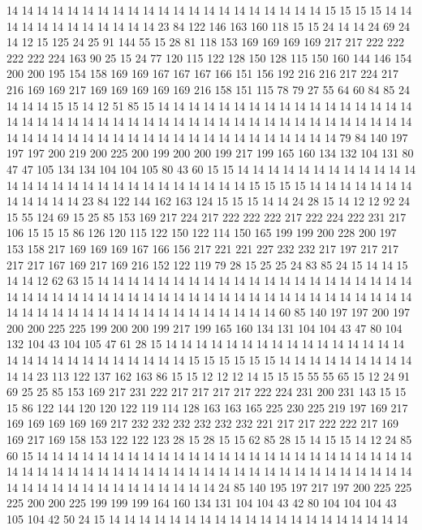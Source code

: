 14 14 14 14 14 14 14 14 14 14 14 14 14 14 14 14 14 14 14 14
14 15 15 15 15 14 14 14 14 14 14 14 14 14 14 14 14 23 84 122
146 163 160 118 15 15 24 14 14 24 69 24 14 12 15 125 24 25 91 144
55 15 28 81 118 153 169 169 169 169 217 217 222 222 222 222 224 163 90 25
15 24 77 120 115 122 128 150 128 115 150 160 144 146 154 200 200 195 154 158
169 169 167 167 167 166 151 156 192 216 216 217 224 217 216 169 169 217 169 169
169 169 169 216 158 151 115 78 79 27 55 64 60 84 85 24 14 14 14 15
15 14 12 51 85 15 14 14 14 14 14 14 14 14 14 14 14 14 14 14
14 14 14 14 14 14 14 14 14 14 14 14 14 14 14 14 14 14 14 14
14 14 14 14 14 14 14 14 14 14 14 14 14 14 14 14 14 14 14 14
14 14 14 14 14 14 14 14 14 14 14 14 79 84 140 197 197 197 200 219
200 225 200 199 200 200 199 217 199 165 160 134 132 104 131 80 47 47 105 134
134 104 104 105 80 43 60 15 15 14 14 14 14 14 14 14 14 14 14 14
14 14 14 14 14 14 14 14 14 14 14 14 14 14 14 14 14 15 15 15
15 14 14 14 14 14 14 14 14 14 14 14 14 23 84 122 144 162 163 124
15 15 15 14 14 24 28 15 14 12 12 92 24 15 55 124 69 15 25 85
153 169 217 224 217 222 222 222 217 222 224 222 231 217 106 15 15 15 86 126
120 115 122 150 122 114 150 165 199 199 200 228 200 197 153 158 217 169 169 169
167 166 156 217 221 221 227 232 232 217 197 217 217 217 217 167 169 217 169 216
152 122 119 79 28 15 25 25 24 83 85 24 15 14 14 15 14 14 12 62
63 15 14 14 14 14 14 14 14 14 14 14 14 14 14 14 14 14 14 14
14 14 14 14 14 14 14 14 14 14 14 14 14 14 14 14 14 14 14 14
14 14 14 14 14 14 14 14 14 14 14 14 14 14 14 14 14 14 14 14
14 14 14 14 14 14 14 14 60 85 140 197 197 200 197 200 200 225 225 199
200 200 199 217 199 165 160 134 131 104 104 43 47 80 104 132 104 43 104 105
47 61 28 15 14 14 14 14 14 14 14 14 14 14 14 14 14 14 14 14
14 14 14 14 14 14 14 14 14 14 14 14 15 15 15 15 15 15 14 14
14 14 14 14 14 14 14 14 14 23 113 122 137 162 163 86 15 15 12 12
12 14 15 15 15 55 55 65 15 12 24 91 69 25 25 85 153 169 217 231
222 217 217 217 217 222 224 231 200 231 143 15 15 15 86 122 144 120 120 122
119 114 128 163 163 165 225 230 225 219 197 169 217 169 169 169 169 169 217 232
232 232 232 232 232 221 217 217 222 222 217 169 169 217 169 158 153 122 122 123
28 15 28 15 15 62 85 28 15 14 15 15 14 12 24 85 60 15 14 14
14 14 14 14 14 14 14 14 14 14 14 14 14 14 14 14 14 14 14 14
14 14 14 14 14 14 14 14 14 14 14 14 14 14 14 14 14 14 14 14
14 14 14 14 14 14 14 14 14 14 14 14 14 14 14 14 14 14 14 14
14 14 14 14 24 85 140 195 197 217 197 200 225 225 225 200 200 225 199 199
199 164 160 134 131 104 104 43 42 80 104 104 104 43 105 104 42 50 24 15
14 14 14 14 14 14 14 14 14 14 14 14 14 14 14 14 14 14 14 14
